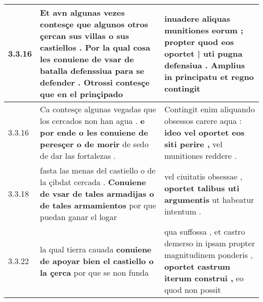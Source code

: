 \begin{tabular}{|p{1cm}|p{6.5cm}|p{6.5cm}|}
3.3.16 & Et avn algunas vezes contesçe que algunos otros çercan sus villas o sus castiellos . \textbf{ Por la qual cosa les conuiene de vsar de batalla defenssiua para se defender . } Otrossi contesçe que en el prinçipado & inuadere aliquas munitiones eorum ; \textbf{ propter quod eos oportet | uti pugna defensiua . } Amplius in principatu et regno contingit \\\hline
3.3.16 & Ca contesçe algunas vegadas que los cercados non han agua . \textbf{ e por ende o les conuiene de peresçer o de morir } de sedo de dar las fortalezas . & Contingit enim aliquando obsessos carere aqua : \textbf{ ideo vel oportet eos siti perire , } vel munitiones reddere . \\\hline
3.3.18 & fasta las menas del castiello o de la çibdat cercada . \textbf{ Conuiene de vsar de tales armadijas o de tales armamientos } por que puedan ganar el logar & vel ciuitatis obsessae , \textbf{ oportet talibus uti argumentis } ut habeatur intentum . \\\hline
3.3.22 & la qual tierra cauada \textbf{ conuiene de apoyar bien el castiello o la çerca } por que se non funda & qua suffossa , et castro demerso in ipsam propter magnitudinem ponderis , \textbf{ oportet castrum iterum construi , } eo quod non possit \\\hline

\end{tabular}
